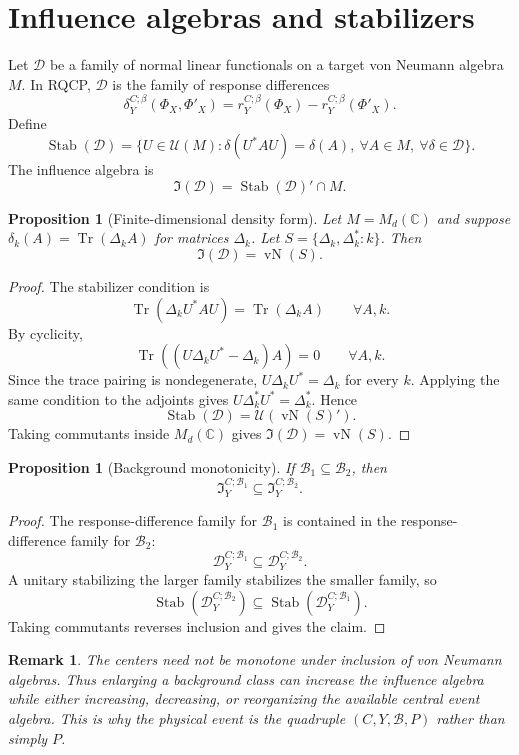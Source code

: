 \documentclass[11pt]{article}
\newtheorem{proposition}[theorem]{Proposition}
\newtheorem{remark}[theorem]{Remark}
\newcommand{\B}{\mathcal B}
\newcommand{\D}{\mathcal D}
\newcommand{\I}{\mathfrak I}
\newcommand{\Tr}{\operatorname{Tr}}
\newcommand{\vN}{\operatorname{vN}}
\newcommand{\Stab}{\operatorname{Stab}}
\begin{document}
\section{Influence algebras and stabilizers}\label{app:influence}

Let $\D$ be a family of normal linear functionals on a target von Neumann algebra $M$.  In RQCP, $\D$ is the family of response differences
\[
\delta_Y^{C;\beta}(\Phi_X,\Phi'_X)=r_Y^{C;\beta}(\Phi_X)-r_Y^{C;\beta}(\Phi'_X).
\]
Define
\[
\Stab(\D)=\{U\in\mathcal U(M):\delta(U^*AU)=\delta(A),\ \forall A\in M,\ \forall\delta\in\D\}.
\]
The influence algebra is
\[
\I(\D)=\Stab(\D)'\cap M.
\]

\begin{proposition}[Finite-dimensional density form]\label{prop:stabfinite}
Let $M=M_d(\mathbb C)$ and suppose $\delta_k(A)=\Tr(\Delta_k A)$ for matrices $\Delta_k$.  Let $S=\{\Delta_k,\Delta_k^*:k\}$.  Then
\[
\I(\D)=\vN(S).
\]
\end{proposition}

\begin{proof}
The stabilizer condition is
\[
\Tr(\Delta_kU^*AU)=\Tr(\Delta_kA)
\qquad\forall A,k.
\]
By cyclicity,
\[
\Tr((U\Delta_kU^*-\Delta_k)A)=0\qquad\forall A,k.
\]
Since the trace pairing is nondegenerate, $U\Delta_kU^*=\Delta_k$ for every $k$.  Applying the same condition to the adjoints gives $U\Delta_k^*U^*=\Delta_k^*$.  Hence
\[
\Stab(\D)=\mathcal U(\vN(S)').
\]
Taking commutants inside $M_d(\mathbb C)$ gives $\I(\D)=\vN(S)$.
\end{proof}

\begin{proposition}[Background monotonicity]
If $\B_1\subseteq\B_2$, then
\[
\I_Y^{C;\B_1}\subseteq \I_Y^{C;\B_2}.
\]
\end{proposition}

\begin{proof}
The response-difference family for $\B_1$ is contained in the response-difference family for $\B_2$:
\[
\D^{C;\B_1}_Y\subseteq\D^{C;\B_2}_Y.
\]
A unitary stabilizing the larger family stabilizes the smaller family, so
\[
\Stab(\D^{C;\B_2}_Y)\subseteq\Stab(\D^{C;\B_1}_Y).
\]
Taking commutants reverses inclusion and gives the claim.
\end{proof}

\begin{remark}
The centers need not be monotone under inclusion of von Neumann algebras.  Thus enlarging a background class can increase the influence algebra while either increasing, decreasing, or reorganizing the available central event algebra.  This is why the physical event is the quadruple $(C,Y,\B,P)$ rather than simply $P$.
\end{remark}
\end{document}
